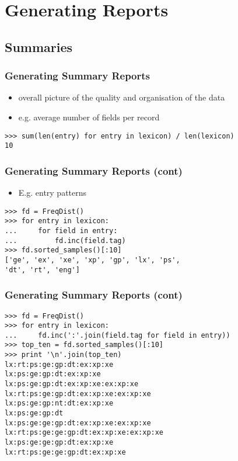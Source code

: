 \documentclass{beamer}             %
\begin{document}
\section{Generating Reports}

\subsection{Summaries}

\begin{frame}[fragile]
\frametitle{Generating Summary Reports}
\begin{itemize}
\item overall picture of the quality and organisation of the data
\item e.g. average number of fields per record
\end{itemize}

\small
\begin{verbatim}
>>> sum(len(entry) for entry in lexicon) / len(lexicon)
10
\end{verbatim}
\end{frame}

\begin{frame}[fragile]
\frametitle{Generating Summary Reports (cont)}
\begin{itemize}
\item E.g. entry patterns
\end{itemize}

\small
\begin{verbatim}
>>> fd = FreqDist()
>>> for entry in lexicon:
...     for field in entry:
...	        fd.inc(field.tag)
>>> fd.sorted_samples()[:10]
['ge', 'ex', 'xe', 'xp', 'gp', 'lx', 'ps',
'dt', 'rt', 'eng']
\end{verbatim}
\end{frame}

\begin{frame}[fragile]
\frametitle{Generating Summary Reports (cont)}
\small

\begin{verbatim}
>>> fd = FreqDist()
>>> for entry in lexicon:
...	    fd.inc(':'.join(field.tag for field in entry))
>>> top_ten = fd.sorted_samples()[:10]
>>> print '\n'.join(top_ten)
lx:rt:ps:ge:gp:dt:ex:xp:xe
lx:ps:ge:gp:dt:ex:xp:xe
lx:ps:ge:gp:dt:ex:xp:xe:ex:xp:xe
lx:rt:ps:ge:gp:dt:ex:xp:xe:ex:xp:xe
lx:ps:ge:gp:nt:dt:ex:xp:xe
lx:ps:ge:gp:dt
lx:ps:ge:ge:gp:dt:ex:xp:xe:ex:xp:xe
lx:rt:ps:ge:ge:gp:dt:ex:xp:xe:ex:xp:xe
lx:ps:ge:ge:gp:dt:ex:xp:xe
lx:rt:ps:ge:ge:gp:dt:ex:xp:xe
\end{verbatim}
\end{frame}
\end{document}
